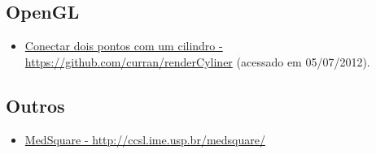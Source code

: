 \subsection{OpenGL}
\begin{itemize}
  \item \href{https://github.com/curran/renderCyliner}{Conectar dois pontos com um cilindro - https://github.com/curran/renderCyliner} (acessado em 05/07/2012).
\end{itemize}

\subsection{Outros}
\begin{itemize}
  \item \label{medsquare}\href{http://ccsl.ime.usp.br/medsquare/}{MedSquare - http://ccsl.ime.usp.br/medsquare/}
\end{itemize}
